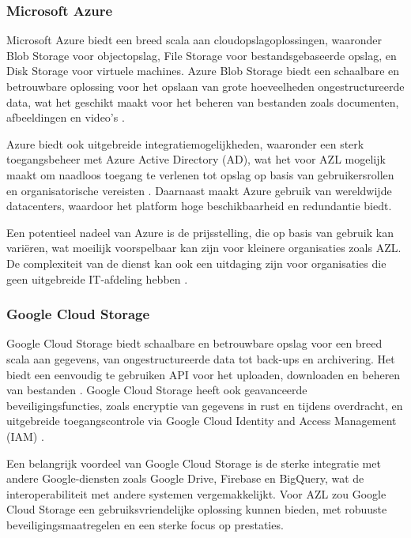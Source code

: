 \subsubsection{Microsoft Azure}
Microsoft Azure biedt een breed scala aan cloudopslagoplossingen, waaronder Blob Storage voor objectopslag, File Storage voor bestandsgebaseerde opslag, en Disk Storage voor virtuele machines. Azure Blob Storage biedt een schaalbare en betrouwbare oplossing voor het opslaan van grote hoeveelheden ongestructureerde data, wat het geschikt maakt voor het beheren van bestanden zoals documenten, afbeeldingen en video's \autocite{azure_blob}.

Azure biedt ook uitgebreide integratiemogelijkheden, waaronder een sterk toegangsbeheer met Azure Active Directory (AD), wat het voor AZL mogelijk maakt om naadloos toegang te verlenen tot opslag op basis van gebruikersrollen en organisatorische vereisten \autocite{azure_ad}. Daarnaast maakt Azure gebruik van wereldwijde datacenters, waardoor het platform hoge beschikbaarheid en redundantie biedt.

Een potentieel nadeel van Azure is de prijsstelling, die op basis van gebruik kan variëren, wat moeilijk voorspelbaar kan zijn voor kleinere organisaties zoals AZL. De complexiteit van de dienst kan ook een uitdaging zijn voor organisaties die geen uitgebreide IT-afdeling hebben \autocite{azure_pricing}.

\subsubsection{Google Cloud Storage}
Google Cloud Storage biedt schaalbare en betrouwbare opslag voor een breed scala aan gegevens, van ongestructureerde data tot back-ups en archivering. Het biedt een eenvoudig te gebruiken API voor het uploaden, downloaden en beheren van bestanden \autocite{google_storage}. Google Cloud Storage heeft ook geavanceerde beveiligingsfuncties, zoals encryptie van gegevens in rust en tijdens overdracht, en uitgebreide toegangscontrole via Google Cloud Identity and Access Management (IAM) \autocite{google_iam}.

Een belangrijk voordeel van Google Cloud Storage is de sterke integratie met andere Google-diensten zoals Google Drive, Firebase en BigQuery, wat de interoperabiliteit met andere systemen vergemakkelijkt. Voor AZL zou Google Cloud Storage een gebruiksvriendelijke oplossing kunnen bieden, met robuuste beveiligingsmaatregelen en een sterke focus op prestaties.

